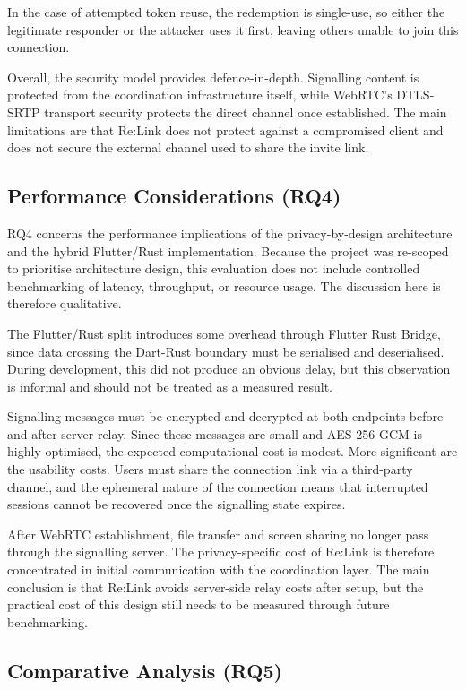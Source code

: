 \documentclass[12pt,a4paper]{article}
\begin{document}
In the case of attempted token reuse, the redemption is single-use, so either the legitimate responder or the attacker uses it first, leaving others unable to join this connection.

Overall, the security model provides defence-in-depth. Signalling content is protected from the coordination infrastructure itself, while WebRTC’s DTLS-SRTP transport security protects the direct channel once established. The main limitations are that Re:Link does not protect against a compromised client and does not secure the external channel used to share the invite link.

\subsection{Performance Considerations (RQ4)}

RQ4 concerns the performance implications of the privacy-by-design architecture and the hybrid Flutter/Rust implementation. Because the project was re-scoped to prioritise architecture design, this evaluation does not include controlled benchmarking of latency, throughput, or resource usage. The discussion here is therefore qualitative.

The Flutter/Rust split introduces some overhead through Flutter Rust Bridge, since data crossing the Dart-Rust boundary must be serialised and deserialised. During development, this did not produce an obvious delay, but this observation is informal and should not be treated as a measured result.

Signalling messages must be encrypted and decrypted at both endpoints before and after server relay. Since these messages are small and AES-256-GCM is highly optimised, the expected computational cost is modest. More significant are the usability costs. Users must share the connection link via a third-party channel, and the ephemeral nature of the connection means that interrupted sessions cannot be recovered once the signalling state expires.

After WebRTC establishment, file transfer and screen sharing no longer pass through the signalling server. The privacy-specific cost of Re:Link is therefore concentrated in initial communication with the coordination layer. The main conclusion is that Re:Link avoids server-side relay costs after setup, but the practical cost of this design still needs to be measured through future benchmarking.

\subsection{Comparative Analysis (RQ5)}
\end{document}
